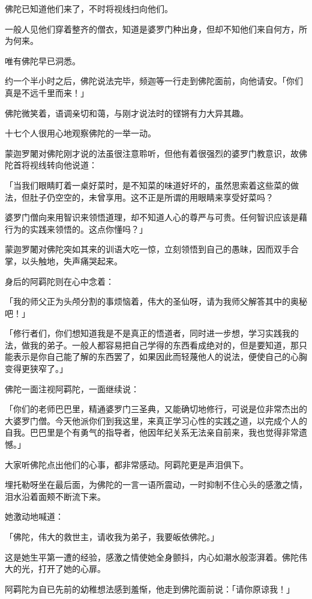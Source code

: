 \documentclass[twoside,openany]{book}
\begin{document}
佛陀已知道他们来了，不时将视线扫向他们。

一般人见他们穿着整齐的僧衣，知道是婆罗门种出身，但却不知他们来自何方，所为何来。

唯有佛陀早已洞悉。

约一个半小时之后，佛陀说法完毕，频迦等一行走到佛陀面前，向他请安。「你们真是不远千里而来！」

佛陀微笑着，语调亲切和蔼，与刚才说法时的铿锵有力大异其趣。

十七个人很用心地观察佛陀的一举一动。

蒙迦罗闍对佛陀刚才说的法虽很注意聆听，但他有着很强烈的婆罗门教意识，故佛陀首将视线转向他说道：

「当我们眼睛盯着一桌好菜时，是不知菜的味道好坏的，虽然思索着这些菜的做法，但肚子仍空空的，未曾享用。这不正是所谓的用眼睛来享受好菜吗？

婆罗门僧向来用智识来领悟道理，却不知道人心的尊严与可贵。任何智识应该是藉行为的实践来领悟的。这点你懂吗？」

蒙迦罗闍对佛陀突如其来的训语大吃一惊，立刻领悟到自己的愚昧，因而双手合掌，以头触地，失声痛哭起来。

身后的阿羁陀则在心中念着：

「我的师父正为头颅分割的事烦恼着，伟大的圣仙呀，请为我师父解答其中的奥秘吧！」

「修行者们，你们想知道我是不是真正的悟道者，同时进一步想，学习实践我的法，做我的弟子。一般人都容易把自己学得的东西看成绝对的，但是要知道，那只能表示是你自己能了解的东西罢了，如果因此而轻蔑他人的说法，便使自己的心胸变得更狭窄了。」

佛陀一面注视阿羁陀，一面继续说：

「你们的老师巴巴里，精通婆罗门三圣典，又能确切地修行，可说是位非常杰出的大婆罗门僧。今天他派你们到我这里，来真正学习心性的实践之道，以完成个人的自我。巴巴里是个有勇气的指导者，他因年纪关系无法亲自前来，我也觉得非常遗憾。」

大家听佛陀点出他们的心事，都非常感动。阿羁陀更是声泪俱下。

埋托勒呀坐在最后面，为佛陀的一言一语所震动，一时抑制不住心头的感激之情，泪水沿着面颊不断流下来。

她激动地喊道：

「佛陀，伟大的救世主，请收我为弟子，我要皈依佛陀。」

这是她生平第一遭的经验，感激之情使她全身颤抖，内心如潮水般澎湃着。佛陀伟大的光，打开了她的心扉。

阿羁陀为自已先前的幼稚想法感到羞惭，他走到佛陀面前说：「请你原谅我！」
\end{document}
